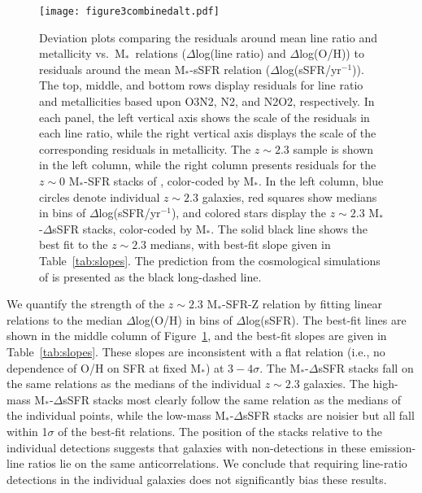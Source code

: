 \documentclass[iop,twocolappendix]{emulateapj}
\newcommand{\mstar}{$\mbox{M}_*$}
\begin{document}
\begin{figure}
 \texttt{[image: figure3combinedalt.pdf]}
 \centering
 \caption{Deviation plots comparing the residuals around mean line ratio and metallicity vs.~\mstar\
 relations ($\Delta$log(line ratio) and $\Delta$log(O/H)) to residuals around the mean
 \mstar-sSFR relation ($\Delta$log(sSFR/yr$^{-1}$)).  The top, middle, and bottom rows display
 residuals for line ratio and metallicities based upon O3N2, N2, and N2O2, respectively.
  In each panel, the left vertical axis shows the scale of the residuals in each line ratio,
 while the right vertical axis displays the scale of the corresponding residuals in metallicity.
  The $z\sim2.3$ sample is shown in the left column, while the right column presents
 residuals for the $z\sim0$ \mstar-SFR stacks of \citet{and13}, color-coded by \mstar.
  In the left column,
 blue circles denote individual $z\sim2.3$ galaxies, red squares show medians in bins of
 $\Delta$log(sSFR/yr$^{-1}$), and colored stars display the $z\sim2.3$ \mstar-$\Delta$sSFR stacks,
 color-coded by \mstar.
  The solid black line shows the best fit to the $z\sim2.3$ medians,
 with best-fit slope given in Table~\ref{tab:slopes}.
  The prediction from the cosmological simulations of \citet{dav17} is presented as
 the black long-dashed line.
}\label{fig3}
\end{figure}
 
We quantify the strength of the $z\sim2.3$ \mstar-SFR-Z relation by
 fitting linear relations to the median $\Delta$log(O/H) in bins of $\Delta$log(sSFR).
  The best-fit lines are shown in the middle column of Figure~\ref{fig3},
 and the best-fit slopes are given in Table~\ref{tab:slopes}.
  These slopes are inconsistent with a flat relation (i.e., no dependence of O/H on SFR at fixed \mstar)
 at $3-4\sigma$.  The \mstar-$\Delta$sSFR stacks fall on the same relations as the medians of the
 individual $z\sim2.3$ galaxies.  The high-mass \mstar-$\Delta$sSFR stacks most clearly follow the same
 relation as the medians of the individual points, while the low-mass \mstar-$\Delta$sSFR stacks are noisier
 but all fall within 1$\sigma$ of the best-fit relations.  The position of the stacks relative
 to the individual detections suggests that galaxies with non-detections in these
 emission-line ratios lie on the same anticorrelations.  We conclude that requiring line-ratio
 detections in the individual galaxies does not significantly bias these results.
\end{document}
